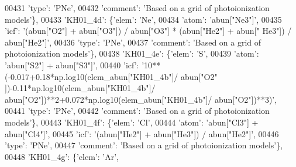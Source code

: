 \begin{DoxyCode}
00431                                      \textcolor{stringliteral}{'type'}: \textcolor{stringliteral}{'PNe'},
00432                                      \textcolor{stringliteral}{'comment'}: \textcolor{stringliteral}{'Based on a grid of photoionization models'}\},
00433                          \textcolor{stringliteral}{'KH01\_4d'}: \{\textcolor{stringliteral}{'elem'}: \textcolor{stringliteral}{'Ne'},
00434                                      \textcolor{stringliteral}{'atom'}: \textcolor{stringliteral}{'abun["Ne3"]'},
00435                                      \textcolor{stringliteral}{'icf'}: \textcolor{stringliteral}{'(abun["O2"] + abun["O3"]) / abun["O3"] * (abun["He2"] + abun["
      He3"]) / abun["He2"]'},
00436                                      \textcolor{stringliteral}{'type'}: \textcolor{stringliteral}{'PNe'},
00437                                      \textcolor{stringliteral}{'comment'}: \textcolor{stringliteral}{'Based on a grid of photoionization models'}\},
00438                          \textcolor{stringliteral}{'KH01\_4e'}: \{\textcolor{stringliteral}{'elem'}: \textcolor{stringliteral}{'S'},
00439                                      \textcolor{stringliteral}{'atom'}: \textcolor{stringliteral}{'abun["S2"] + abun["S3"]'},
00440                                      \textcolor{stringliteral}{'icf'}: \textcolor{stringliteral}{'10**(-0.017+0.18*np.log10(elem\_abun["KH01\_4b"]/ abun["O2"
      ])-0.11*np.log10(elem\_abun["KH01\_4b"]/ abun["O2"])**2+0.072*np.log10(elem\_abun["KH01\_4b"]/ abun["O2"])**3)'},
00441                                      \textcolor{stringliteral}{'type'}: \textcolor{stringliteral}{'PNe'},
00442                                      \textcolor{stringliteral}{'comment'}: \textcolor{stringliteral}{'Based on a grid of photoionization models'}\},
00443                          \textcolor{stringliteral}{'KH01\_4f'}: \{\textcolor{stringliteral}{'elem'}: \textcolor{stringliteral}{'Cl'},
00444                                      \textcolor{stringliteral}{'atom'}: \textcolor{stringliteral}{'abun["Cl3"] + abun["Cl4"]'},
00445                                      \textcolor{stringliteral}{'icf'}: \textcolor{stringliteral}{'(abun["He2"] + abun["He3"]) / abun["He2"]'},
00446                                      \textcolor{stringliteral}{'type'}: \textcolor{stringliteral}{'PNe'},
00447                                      \textcolor{stringliteral}{'comment'}: \textcolor{stringliteral}{'Based on a grid of photoionization models'}\},
00448                          \textcolor{stringliteral}{'KH01\_4g'}: \{\textcolor{stringliteral}{'elem'}: \textcolor{stringliteral}{'Ar'},

\end{DoxyCode}
